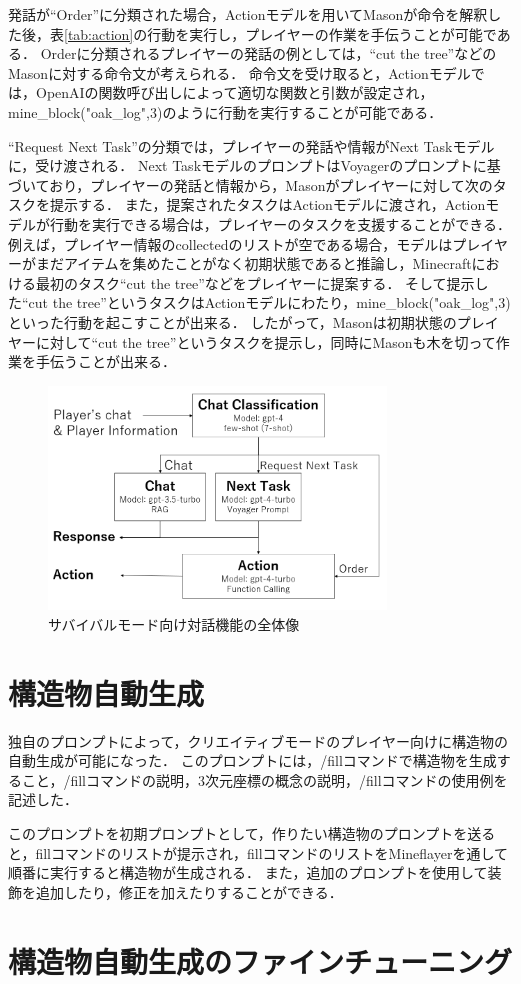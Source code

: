 発話が``Order''に分類された場合，Actionモデルを用いてMasonが命令を解釈した後，表\ref{tab:action}の行動を実行し，プレイヤーの作業を手伝うことが可能である．
Orderに分類されるプレイヤーの発話の例としては，``cut the tree''などのMasonに対する命令文が考えられる．
命令文を受け取ると，Actionモデルでは，OpenAIの関数呼び出しによって適切な関数と引数が設定され，mine\_block("oak\_log",3)のように行動を実行することが可能である．

``Request Next Task''の分類では，プレイヤーの発話や情報がNext Taskモデルに，受け渡される．
Next TaskモデルのプロンプトはVoyagerのプロンプトに基づいており，プレイヤーの発話と情報から，Masonがプレイヤーに対して次のタスクを提示する．
また，提案されたタスクはActionモデルに渡され，Actionモデルが行動を実行できる場合は，プレイヤーのタスクを支援することができる．
例えば，プレイヤー情報のcollectedのリストが空である場合，モデルはプレイヤーがまだアイテムを集めたことがなく初期状態であると推論し，Minecraftにおける最初のタスク``cut the tree''などをプレイヤーに提案する．
そして提示した``cut the tree''というタスクはActionモデルにわたり，mine\_block("oak\_log",3)といった行動を起こすことが出来る．
したがって，Masonは初期状態のプレイヤーに対して``cut the tree''というタスクを提示し，同時にMasonも木を切って作業を手伝うことが出来る．

\begin{figure}[H]
    \centering
    \includegraphics[width=0.8\textwidth]{fig/interactive_function.PNG}
    \caption{サバイバルモード向け対話機能の全体像}
    \label{fig:interactive_function}
\end{figure}

\section{構造物自動生成}\label{sec:build_mode}
独自のプロンプトによって，クリエイティブモードのプレイヤー向けに構造物の自動生成が可能になった．
このプロンプトには，/fillコマンドで構造物を生成すること，/fillコマンドの説明，3次元座標の概念の説明，/fillコマンドの使用例を記述した．

このプロンプトを初期プロンプトとして，作りたい構造物のプロンプトを送ると，fillコマンドのリストが提示され，fillコマンドのリストをMineflayerを通して順番に実行すると構造物が生成される．
また，追加のプロンプトを使用して装飾を追加したり，修正を加えたりすることができる．
\section{構造物自動生成のファインチューニング}
